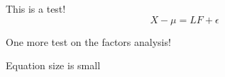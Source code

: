 This is a test!
\begin{equation*}
X - \mu = L F + \epsilon
\end{equation*}

One more test on the factors analysis!

Equation size is small
